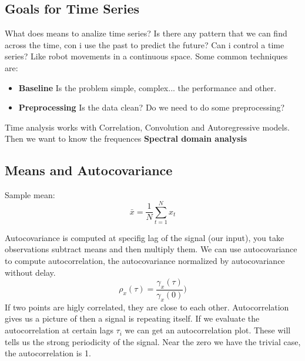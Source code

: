 \documentclass[12pt]{book}
\begin{document}
\subsection{Goals for Time Series}
What does means to analize time series? Is there any pattern that we can find across the time, con i use the past to predict the future? \newline
Can i control a time series? Like robot movements in a continuous space. \newline
Some common techniques are: \newline
\begin{itemize}
	\item \textbf{Baseline} Is the problem simple, complex... the performance and other.
	\item \textbf{Preprocessing} Is the data clean? Do we need to do some preprocessing?
\end{itemize}

Time analysis works with Correlation, Convolution and Autoregressive models. \newline
Then we want to know the frequences \textbf{Spectral domain analysis} \newline

\subsection{Means and Autocovariance}
Sample mean:
\begin{equation}
\bar{x}=\frac{1}{N}\sum_{t=1}^N x_t
\end{equation}

Autocovariance is computed at specifig lag of the signal (our input), you take observations subtract means and then multiply them. \newline
We can use autocovariance to compute autocorrelation, the autocovariance normalized by autocovariance without delay.
\begin{equation}
\rho_x(\tau)=\frac{\gamma_x(\tau)}{\gamma_x(0)})
\end{equation}
If two points are higly correlated, they are close to each other. \newline
Autocorrelation gives us a picture of then a signal is repeating itself. \newline
If we evaluate the autocorrelation at certain lags $\tau_i$ we can get an autocorrelation plot. \newline
These will tells us the strong periodicity of the signal. Near the zero we have the trivial case, the autocorrelation is 1. \newline
\end{document}
